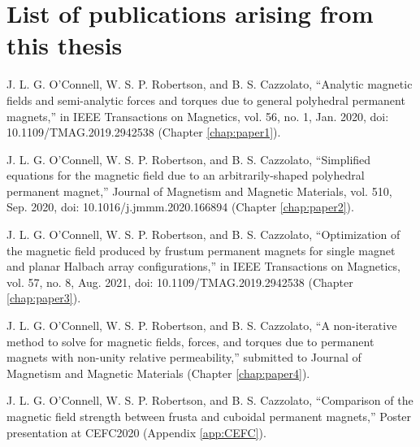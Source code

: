 
\newpage
\chapter*{List of publications arising from this thesis}

\noindent J. L. G. O’Connell, W. S. P. Robertson, and B. S. Cazzolato, ``Analytic magnetic fields and semi-analytic forces and torques due to general polyhedral permanent magnets,'' in IEEE Transactions on Magnetics, vol. 56, no. 1, Jan. 2020, doi: 10.1109/TMAG.2019.2942538 (Chapter \ref{chap:paper1}).

\vspace{0.5cm}
\noindent J. L. G. O’Connell, W. S. P. Robertson, and B. S. Cazzolato, ``Simplified equations for the magnetic field due to an arbitrarily-shaped polyhedral permanent magnet,'' Journal of Magnetism and Magnetic Materials, vol. 510, Sep. 2020, doi: 10.1016/j.jmmm.2020.166894 (Chapter \ref{chap:paper2}).

\vspace{0.5cm}
\noindent J. L. G. O’Connell, W. S. P. Robertson, and B. S. Cazzolato, ``Optimization of the magnetic field produced by frustum permanent magnets for single magnet and planar Halbach array configurations,'' in IEEE Transactions on Magnetics, vol. 57, no. 8, Aug. 2021, doi: 10.1109/TMAG.2019.2942538 (Chapter \ref{chap:paper3}).

\vspace{0.5cm}
\noindent J. L. G. O'Connell, W. S. P. Robertson, and B. S. Cazzolato, ``A non-iterative method to solve for magnetic fields, forces, and torques due to permanent magnets with non-unity relative permeability,'' submitted to Journal of Magnetism and Magnetic Materials (Chapter \ref{chap:paper4}).

\vspace{0.5cm}
\noindent J. L. G. O'Connell, W. S. P. Robertson, and B. S. Cazzolato, ``Comparison of the magnetic field strength between frusta and cuboidal permanent magnets,'' Poster presentation at CEFC2020 (Appendix \ref{app:CEFC}).